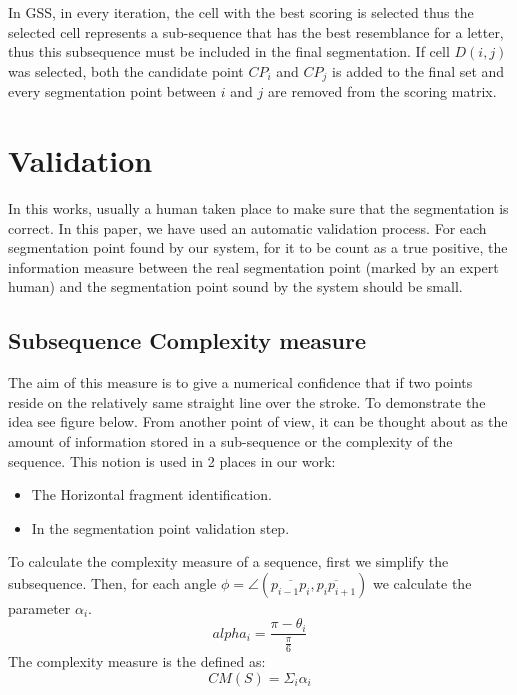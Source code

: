 \documentclass[12pt,journal,compsoc]{IEEEtran}
\begin{document}
In GSS, in every iteration, the cell with the best scoring is selected thus the selected cell represents a sub-sequence that has the best resemblance for a letter, thus this subsequence must be included in the final segmentation. If cell $D(i,j)$ was selected, both the candidate point $CP_{i}$ and $CP_{j}$ is added to the final set and every segmentation point between $i$ and $j$ are removed from the scoring matrix.

\section{Validation}
In this works, usually a human taken place to make sure that the segmentation is correct. In this paper, we have used an automatic validation process. For each segmentation point found by our system, for it to be count as a true positive, the information measure between the real segmentation point (marked by an expert human) and the segmentation point sound by the system should be small.

\subsection{Subsequence Complexity measure }
The aim of this measure is to give a numerical confidence that if two points reside on the relatively same straight line over the stroke. To demonstrate the idea see figure below. From another point of view, it can be thought about as the amount of information stored in a sub-sequence or the complexity of the sequence. This notion is used in 2 places in our work:
\begin{itemize}
\item The Horizontal fragment identification.
\item In the segmentation point validation step.
\end{itemize}

To calculate the complexity measure of a sequence, first we simplify the subsequence. Then, for each angle  $\phi=\angle(\overline{p_{i-1}p_{i}},\overline{p_{i}p_{i+1}})$ we calculate the parameter $\alpha_{i}$.
\begin{equation}
 alpha_{i}=\frac{\pi-\theta_{i}}{\frac{\pi}{6}}
\end{equation}
The complexity measure is the defined as:
\begin{equation}
CM(S)=\Sigma_{i}\alpha_{i}
\end{equation}
\end{document}
